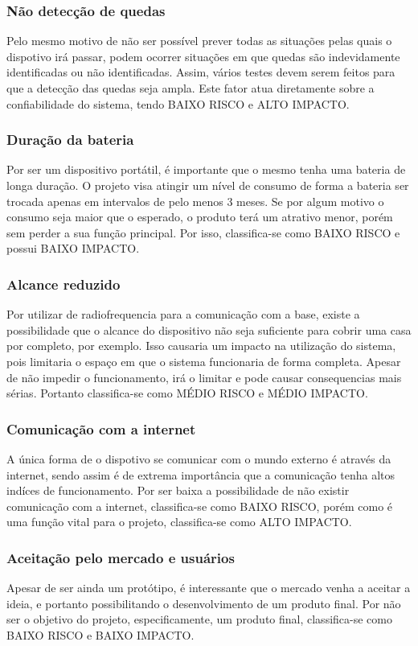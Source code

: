 \documentclass[a4paper]{article}
\begin{document}
\subsubsection{Não detecção de quedas}
Pelo mesmo motivo de não ser possível prever todas as situações pelas quais o dispotivo irá passar, podem ocorrer situações em que quedas são indevidamente identificadas ou não identificadas. Assim, vários testes devem serem feitos para que a detecção das quedas seja ampla. Este fator atua diretamente sobre a confiabilidade do sistema, tendo BAIXO RISCO e ALTO IMPACTO.
\subsubsection{Duração da bateria}
Por ser um dispositivo portátil, é importante que o mesmo tenha uma bateria de longa duração. O projeto visa atingir um nível de consumo de forma a bateria ser trocada apenas em intervalos de pelo menos 3 meses. Se por algum motivo o consumo seja maior que o esperado, o produto terá um atrativo menor, porém sem perder a sua função principal. Por isso, classifica-se como BAIXO RISCO e possui BAIXO IMPACTO.
\subsubsection{Alcance reduzido}
Por utilizar de radiofrequencia para a comunicação com a base, existe a possibilidade que o alcance do dispositivo não seja suficiente para cobrir uma casa por completo, por exemplo. Isso causaria um impacto na utilização do sistema, pois limitaria o espaço em que o sistema funcionaria de forma completa. Apesar de não impedir o funcionamento, irá o limitar e pode causar consequencias mais sérias. Portanto classifica-se como MÉDIO RISCO e MÉDIO IMPACTO.
\subsubsection{Comunicação com a internet}
A única forma de o dispotivo se comunicar com o mundo externo é através da internet, sendo assim é de extrema importância que a comunicação tenha altos indíces de funcionamento. Por ser baixa a possibilidade de não existir comunicação com a internet, classifica-se como BAIXO RISCO, porém como é uma função vital para o projeto, classifica-se como ALTO IMPACTO.
\subsubsection{Aceitação pelo mercado e usuários}
Apesar de ser ainda um protótipo, é interessante que o mercado venha a aceitar a ideia, e portanto possibilitando o desenvolvimento de um produto final. Por não ser o objetivo do projeto, especificamente, um produto final, classifica-se como BAIXO RISCO e BAIXO IMPACTO.
\end{document}

